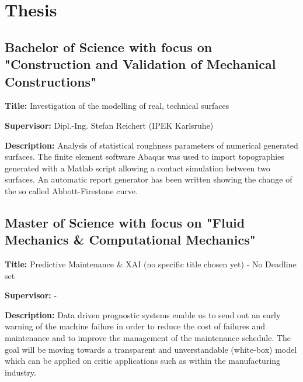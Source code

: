 \documentclass[11pt,a4paper,sans]{moderncv}        %
\begin{document}
\vspace{2pt}



\section{Thesis}
\vspace{3pt}

\subsection{Bachelor of Science with focus on "Construction and Validation of Mechanical Constructions"}

\vspace{3pt}

\textbf{Title:} Investigation of the modelling of real, technical surfaces \newline

\textbf{Supervisor:} Dipl.-Ing. Stefan Reichert (IPEK Karlsruhe) \newline

\textbf{Description:} Analysis of statistical roughness parameters of numerical generated surfaces. The finite element software Abaqus was used to import topographies generated with a Matlab script allowing a contact simulation between two surfaces. An automatic report generator has been written showing the change of the so called Abbott-Firestone curve.

\vspace{6pt}

\subsection{Master of Science with focus on "Fluid Mechanics \& Computational Mechanics"}

\vspace{3pt}

\textbf{Title:} Predictive Maintenance \&  XAI (no specific title chosen yet) - No Deadline set \newline

\textbf{Supervisor:} - \newline

\textbf{Description:} Data driven prognostic systems enable us to send out an early warning of the machine failure in order to reduce the cost of failures and maintenance and to improve the management of the maintenance schedule. The goal will be moving towards a transparent and unverstandable (white-box) model which can be applied on critic applications such as within the manufacturing industry.
\end{document}
